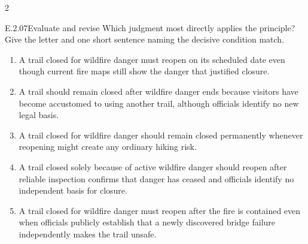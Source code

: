 \documentclass[9pt]{extarticle}
\newcommand{\choice}[1]{\item #1}
\begin{document}
\begin{multicols}{2}
\begin{DenseCoreProblem}{E.2.07}{Evaluate and revise}
Which judgment most directly applies the principle? Give the letter and one short sentence naming the decisive condition match.
\begin{enumerate}[label=(\alph*)]
  \choice{A trail closed for wildfire danger must reopen on its scheduled date even though current fire maps still show the danger that justified closure.}
  \choice{A trail should remain closed after wildfire danger ends because visitors have become accustomed to using another trail, although officials identify no new legal basis.}
  \choice{A trail closed for wildfire danger should remain closed permanently whenever reopening might create any ordinary hiking risk.}
  \choice{A trail closed solely because of active wildfire danger should reopen after reliable inspection confirms that danger has ceased and officials identify no independent basis for closure.}
  \choice{A trail closed for wildfire danger must reopen after the fire is contained even when officials publicly establish that a newly discovered bridge failure independently makes the trail unsafe.}
\end{enumerate}
\end{DenseCoreProblem}
\end{multicols}
\CoreWorkArea
\FormBreak
{}
\end{document}
